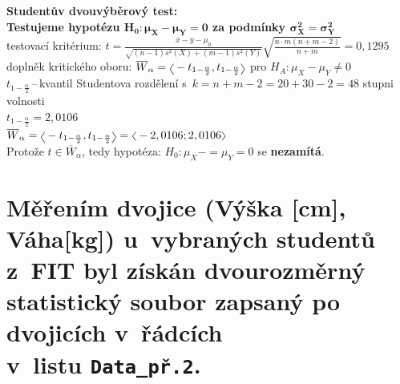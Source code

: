 \documentclass[a4paper, 11pt]{article}
\newcommand{\intlr}[1]{\scaleleftright[1ex]{<}{#1}{>}}
\begin{document}
	\vspace{1em}
	\textbf{Studentův dvouvýběrový test:} \\
	\textbf{Testujeme hypotézu $ \boldsymbol{H_0 : \mu_X - \mu_Y = 0} $ za
	podmínky $ \boldsymbol{\sigma_X^2 = \sigma_Y^2} $} \\
	testovací kritérium: $ t = \frac{\overline{x} - \overline{y} -
	\mu_0}{\sqrt{(n - 1) s^2(X) + (m - 1) s^2(Y)}} \sqrt{\frac{n \cdot m
	(n + m - 2)}{n + m}} = 0,1295 $ \\
	doplněk kritického oboru: $ \overline{W}_\alpha = \intlr{-t_{1 -
	\frac{\alpha}{2}}, t_{1 - \frac{\alpha}{2}}} $ pro $ H_A : \mu_X -
	\mu_Y \neq 0 $ \\
	$ t_{1 - \frac{\alpha}{2}} $\,--\,kvantil Studentova rozdělení s~$ k =
	n + m - 2 = 20 + 30 - 2 = 48 $ stupni volnosti \\
	$ t_{1 - \frac{\alpha}{2}} = 2,0106 $ \\
	$ \overline{W}_\alpha = \intlr{-t_{1 - \frac{\alpha}{2}}, t_{1 -
	\frac{\alpha}{2}}} = \intlr{-2,0106; 2,0106} $ \\
	Protože $ t \in \overline{W}_\alpha $, tedy hypotéza: $ H_0 : \mu_X -
	= \mu_Y = 0 $ se \textbf{nezamítá}.


	\section{
		Měřením dvojice (Výška [cm], Váha[kg]) u~vybraných studentů z~FIT
		byl získán dvourozměrný statistický soubor zapsaný po dvojicích
		v~řádcích \\ v~listu \texttt{Data\_př.2}.
	}
\end{document}
